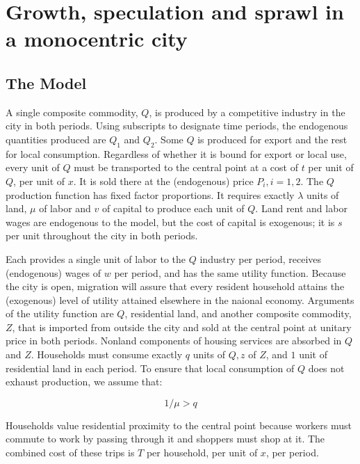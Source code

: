 \chapter{Growth, speculation and sprawl in a monocentric city}

\section{The Model}

A single composite commodity, $Q$, is produced by a competitive industry in the city in both periods. Using subscripts to designate time periods, the endogenous quantities produced are $Q_1$ and $Q_2$. Some $Q$ is produced for export and the rest for local consumption. Regardless of whether it is bound for export or local use, every unit of $Q$ must be transported to the central point at a cost of $t$ per unit of $Q$, per unit of $x$. It is sold there at the (endogenous) price $P_i, i = 1, 2$. The $Q$ production function has fixed factor proportions. It requires exactly $\lambda$ units of land, $\mu$ of labor and $v$ of capital to produce each unit of $Q$. Land rent and labor wages are endogenous to the model, but the cost of capital is exogenous; it is $s$ per unit throughout the city in both periods.

Each provides a single unit of labor to the $Q$ industry per period, receives (endogenous) wages of $w$ per period, and has the same utility function. Because the city is open, migration will assure that every resident household attains the (exogenous) level of utility attained elsewhere in the naional economy. Arguments of the utility function are $Q$, residential land, and another composite commodity, $Z$, that is imported from outside the city and sold at the central point at unitary price in both periods. Nonland components of housing services are absorbed in $Q$ and $Z$. Households must consume exactly $q$ units of $Q, z$ of $Z$, and $1$ unit of residential land in each period. To ensure that local consumption of $Q$ does not exhaust production, we assume that:

\begin{equation*}
    1 / \mu > q
\end{equation*}

Households value residential proximity to the central point because workers must commute to work by passing through it and shoppers must shop at it. The combined cost of these trips  is $T$ per household, per unit of $x$, per period.

